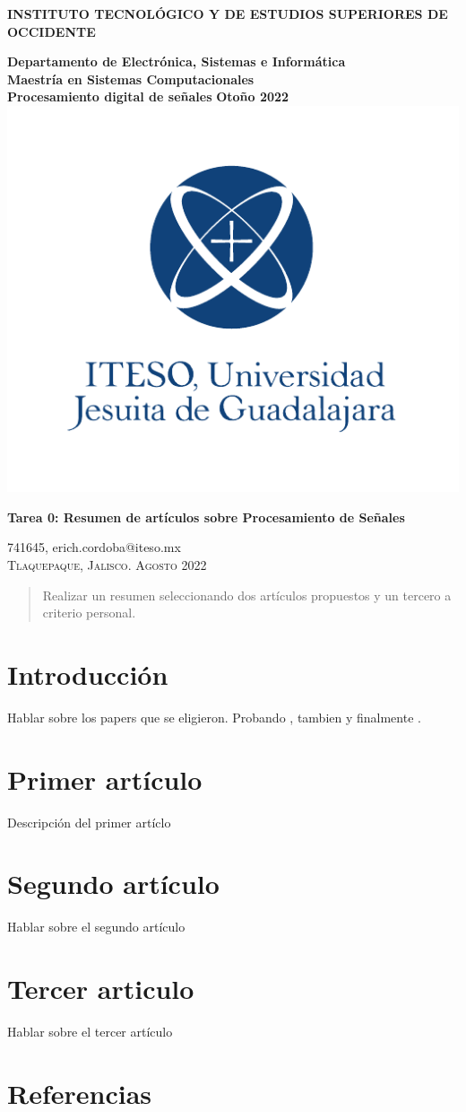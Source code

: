 \documentclass[11pt, twocolumn]{article}
\begin{document}
\begin{titlepage}
	\centering
	\LARGE
	\textbf{INSTITUTO TECNOLÓGICO Y DE ESTUDIOS SUPERIORES DE OCCIDENTE}
	
	\large
	\textbf{Departamento de Electrónica, Sistemas e Informática}\\
	\textbf{Maestría en Sistemas Computacionales}\\
	\vspace{1.0cm}
	\textbf{Procesamiento digital de señales}
	\textbf{Otoño 2022}
	\includegraphics[scale=1.2]{images/iteso_logo}

	\LARGE
	\textbf{Tarea 0: Resumen de artículos sobre Procesamiento de Señales}
	\vfill
	
	\textsf{741645, erich.cordoba@iteso.mx}\\
	\textsc{Tlaquepaque, Jalisco. Agosto 2022}
\end{titlepage}


\begin{abstract}
Realizar un resumen seleccionando dos artículos propuestos y un tercero a criterio personal.

\end{abstract}

\section{Introducción}
Hablar sobre los papers que se eligieron. Probando \cite{haykin}, tambien \cite{golden_age} y finalmente \cite{dps_dead}.

\section{Primer artículo}
Descripción del primer artíclo

\section{Segundo artículo}
Hablar sobre el segundo artículo

\section{Tercer articulo}
Hablar sobre el tercer artículo


\section{Referencias}



\end{document}
